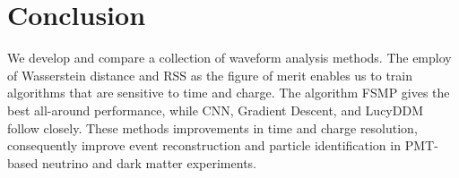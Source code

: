 \section{Conclusion}
\label{sec:conclusion}

We develop and compare a collection of waveform analysis methods. The employ of Wasserstein distance and RSS as the figure of merit enables us to train algorithms that are sensitive to time and charge. The algorithm FSMP gives the best all-around performance, while CNN, Gradient Descent, and LucyDDM follow closely. These methods improvements in time and charge resolution, consequently improve event reconstruction and particle identification in PMT-based neutrino and dark matter experiments. 